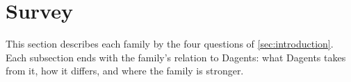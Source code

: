 \section{Survey}
\label{sec:survey}

This section describes each family by the four questions of
\cref{sec:introduction}. Each subsection ends with the family's relation to
Dagents: what Dagents takes from it, how it differs, and where the family is
stronger.








